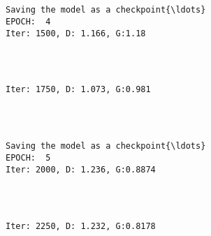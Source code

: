 \documentclass[11pt]{article}
\begin{document}
    \begin{center}
    \end{center}
    { \hspace*{\fill} \\}
    
    \begin{Verbatim}[commandchars=\\\{\}]

Saving the model as a checkpoint{\ldots}
EPOCH:  4
Iter: 1500, D: 1.166, G:1.18
    \end{Verbatim}

    \begin{center}
    \end{center}
    { \hspace*{\fill} \\}
    
    \begin{Verbatim}[commandchars=\\\{\}]

Iter: 1750, D: 1.073, G:0.981
    \end{Verbatim}

    \begin{center}
    \end{center}
    { \hspace*{\fill} \\}
    
    \begin{Verbatim}[commandchars=\\\{\}]

Saving the model as a checkpoint{\ldots}
EPOCH:  5
Iter: 2000, D: 1.236, G:0.8874
    \end{Verbatim}

    \begin{center}
    \end{center}
    { \hspace*{\fill} \\}
    
    \begin{Verbatim}[commandchars=\\\{\}]

Iter: 2250, D: 1.232, G:0.8178
    \end{Verbatim}
\end{document}
